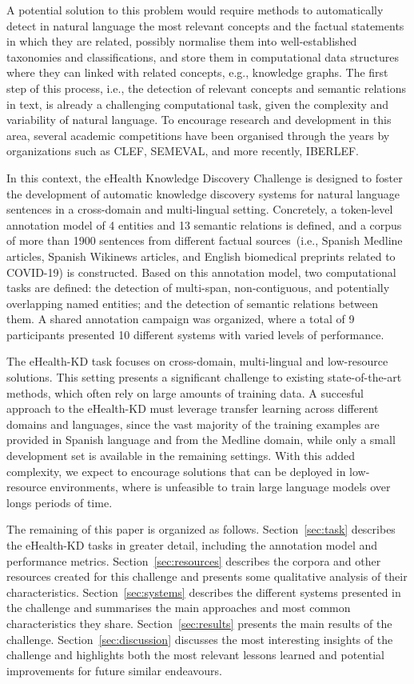 \documentclass[a4paper,11pt,twocolumn,twoside]{article}
\begin{document}
A potential solution to this problem would require methods to automatically detect in natural language the most relevant concepts and the factual statements in which they are related, possibly normalise them into well-established taxonomies and classifications, and store them in computational data structures where they can linked with related concepts, e.g., knowledge graphs.
The first step of this process, i.e., the detection of relevant concepts and semantic relations in text, is already a challenging computational task, given the complexity and variability of natural language.
To encourage research and development in this area, several academic competitions have been organised through the years by organizations such as CLEF, SEMEVAL, and more recently, IBERLEF.

In this context, the eHealth Knowledge Discovery Challenge is designed to foster the development of automatic knowledge discovery systems for natural language sentences in a cross-domain and multi-lingual setting.
Concretely, a token-level annotation model of 4 entities and 13 semantic relations is defined, and a corpus of more than 1900 sentences from different factual sources~(i.e., Spanish Medline articles, Spanish Wikinews articles, and English biomedical preprints related to COVID-19) is constructed.
Based on this annotation model, two computational tasks are defined: the detection of multi-span, non-contiguous, and potentially overlapping named entities; and the detection of semantic relations between them.
A shared annotation campaign was organized, where a total of 9 participants presented 10 different systems with varied levels of performance.

The eHealth-KD task focuses on cross-domain, multi-lingual and low-resource solutions. This setting presents a significant challenge to existing state-of-the-art methods, which often rely on large amounts of training data.
A succesful approach to the eHealth-KD must leverage transfer learning across different domains and languages, since the vast majority of the training examples are provided in Spanish language and from the Medline domain, while only a small development set is available in the remaining settings.
With this added complexity, we expect to encourage solutions that can be deployed in low-resource environments, where is unfeasible to train large language models over longs periods of time.

The remaining of this paper is organized as follows.
Section~\ref{sec:task} describes the eHealth-KD tasks in greater detail, including the annotation model and performance metrics.
Section~\ref{sec:resources} describes the corpora and other resources created for this challenge and presents some qualitative analysis of their characteristics.
Section~\ref{sec:systems} describes the different systems presented in the challenge and summarises the main approaches and most common characteristics they share.
Section~\ref{sec:results} presents the main results of the challenge.
Section~\ref{sec:discussion} discusses the most interesting insights of the challenge and highlights both the most relevant lessons learned and potential improvements for future similar endeavours.
\end{document}
